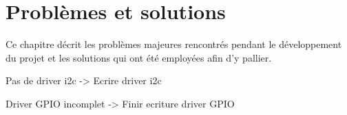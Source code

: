 
\chapter{Problèmes et solutions}\label{ch:prob_solutions}

Ce chapitre décrit les problèmes majeures rencontrés pendant le développement du projet et les solutions qui ont été employées afin d'y pallier.

Pas de driver i2c -> Ecrire driver i2c

Driver GPIO incomplet -> Finir ecriture driver GPIO